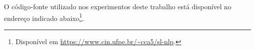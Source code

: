 O código-fonte utilizado nos experimentos deste trabalho está disponível no endereço indicado abaixo\footnote{
    Disponível em \url{https://www.cin.ufpe.br/~cca5/sl-nlp}.
}.













    